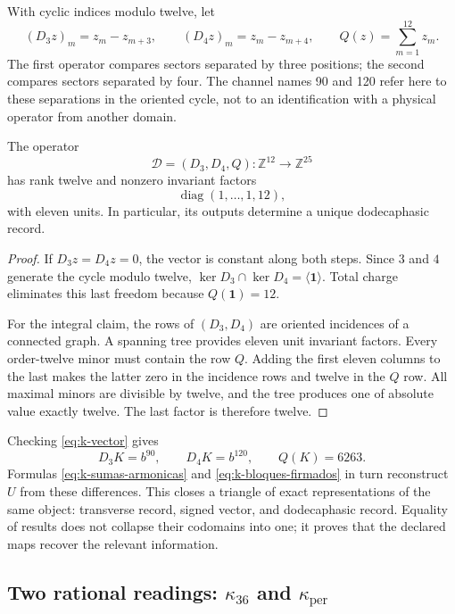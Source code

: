 With cyclic indices modulo twelve, let
\[
 (D_3z)_m=z_m-z_{m+3},\qquad(D_4z)_m=z_m-z_{m+4},
 \qquad Q(z)=\sum_{m=1}^{12}z_m.
\]
The first operator compares sectors separated by three positions; the
second compares sectors separated by four. The channel names 90 and 120 refer here to
these separations in the oriented cycle, not to an identification with a
physical operator from another domain.

\begin{proposition}
\label{prop:k-transversal}
The operator
\[
 \mathcal D=(D_3,D_4,Q):\mathbb Z^{12}\longrightarrow\mathbb Z^{25}
\]
has rank twelve and nonzero invariant factors
\[
 \operatorname{diag}(1,\ldots,1,12),
\]
with eleven units. In particular, its outputs determine a unique dodecaphasic record.
\end{proposition}

\begin{proof}
If \(D_3z=D_4z=0\), the vector is constant along both steps.
Since \(3\) and \(4\) generate the cycle modulo twelve,
\(\ker D_3\cap\ker D_4=\langle\mathbf1\rangle\). Total charge
eliminates this last freedom because \(Q(\mathbf1)=12\).

For the integral claim, the rows of \((D_3,D_4)\) are oriented
incidences of a connected graph. A spanning tree provides eleven
unit invariant factors. Every order-twelve minor must contain the
row \(Q\). Adding the first eleven columns to the last makes the latter
zero in the incidence rows and twelve in the \(Q\) row. All
maximal minors are divisible by twelve, and the tree produces one of
absolute value exactly twelve. The last factor is therefore twelve.
\end{proof}

Checking \eqref{eq:k-vector} gives
\[
 D_3K=b^{90},\qquad D_4K=b^{120},\qquad Q(K)=6263.
\]
Formulas \eqref{eq:k-sumas-armonicas} and
\eqref{eq:k-bloques-firmados} in turn reconstruct \(U\) from these
differences. This closes a triangle of exact representations of the
same object: transverse record, signed vector, and dodecaphasic record. Equality
of results does not collapse their codomains into one; it proves that
the declared maps recover the relevant information.


\subsection{Two rational readings: \texorpdfstring{\(\kappa_{36}\)}{kappa36} and \texorpdfstring{\(\kappa_{\mathrm{per}}\)}{periodic kappa}}
\label{subsec:k-kappas}

